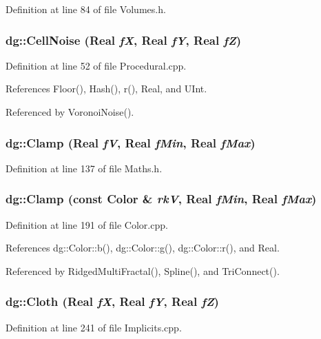 Definition at line 84 of file Volumes.h.
\subsubsection{ dg::Cell\-Noise ({\bf Real} {\em f\-X}, {\bf Real} {\em f\-Y}, {\bf Real} {\em f\-Z})}\label{namespacedg_a127}




Definition at line 52 of file Procedural.cpp.

References Floor(), Hash(), r(), Real, and UInt.

Referenced by Voronoi\-Noise().
\subsubsection{ dg::Clamp ({\bf Real} {\em f\-V}, {\bf Real} {\em f\-Min}, {\bf Real} {\em f\-Max})\hspace{0.3cm}{\tt  [inline]}}\label{namespacedg_a92}




Definition at line 137 of file Maths.h.
\subsubsection{ dg::Clamp (const {\bf Color} \& {\em rk\-V}, {\bf Real} {\em f\-Min}, {\bf Real} {\em f\-Max})}\label{namespacedg_a62}




Definition at line 191 of file Color.cpp.

References dg::Color::b(), dg::Color::g(), dg::Color::r(), and Real.

Referenced by Ridged\-Multi\-Fractal(), Spline(), and Tri\-Connect().
\subsubsection{ dg::Cloth ({\bf Real} {\em f\-X}, {\bf Real} {\em f\-Y}, {\bf Real} {\em f\-Z})}\label{namespacedg_a71}




Definition at line 241 of file Implicits.cpp.

